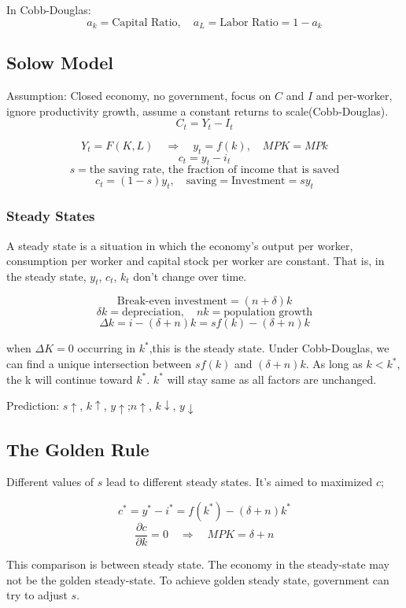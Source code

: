 \documentclass[10pt, a4paper]{article}
\begin{document}
        In Cobb-Douglas:
        $$a_k = \text{Capital Ratio},\quad a_L = \text{Labor Ratio} = 1 - a_k$$
    \subsection{Solow Model}
        Assumption: Closed economy, no government, focus on $C$ and $I$ and per-worker, ignore productivity growth, assume a constant returns to scale(Cobb-Douglas). 
        $$C_t = Y_t - I_t$$

        $$Y_t = F(K, L)\quad \Rightarrow\quad y_t = f(k),\quad MPK = MPk$$
        $$c_t = y_t - i_t$$
        $$s = \text{the saving rate, the fraction of income that is saved}$$
        $$c_t = (1 - s)y_t,\quad \text{saving} = \text{Investment} = sy_t$$

        \subsubsection{Steady States}
            A steady state is a situation in which the economy's output per worker, consumption per worker and capital stock per worker are constant. That is, in the steady state, $y_t$, $c_t$, $k_t$ don't change over time. 

            $$\text{Break-even investment} = (n + \delta)k$$
            $$\delta k = \text{depreciation},\quad nk = \text{population growth}$$
            $$\Delta k = i - (\delta + n)k = sf(k) - (\delta + n)k$$

            when $\Delta K = 0$ occurring in  $k^*$,this is the steady state. Under Cobb-Douglas, we can find a unique intersection between $sf(k)$ and $(\delta + n)k$. As long as $k < k^*$, the k will continue toward $k^*$. $k^*$ will stay same as all factors are unchanged. 

            Prediction: $s\uparrow$, $k\uparrow$, $y\uparrow$;\quad $n\uparrow$, $k\downarrow$, $y\downarrow$

        \subsection{The Golden Rule}
            Different values of $s$ lead to different steady states. It's aimed to maximized $c$;

            $$c^* = y^* - i^* = f(k^*) - (\delta + n)k^*$$
            $$\frac{\partial c}{\partial k} = 0 \quad \Rightarrow \quad MPK = \delta + n $$

            This comparison is between steady state. The economy in the steady-state may not be the golden steady-state. To achieve golden steady state, government can try to adjust $s$. 
            
\end{document}
